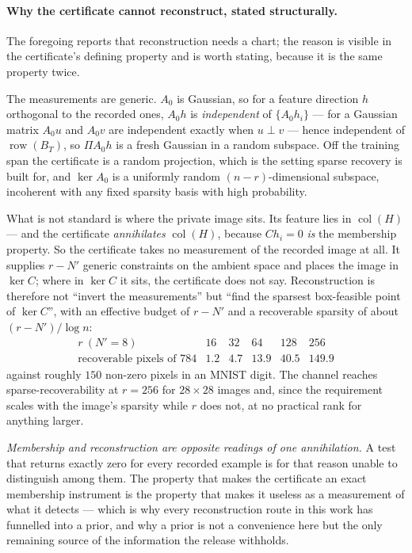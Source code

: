 \paragraph{Why the certificate cannot reconstruct, stated structurally.} The
foregoing reports that reconstruction needs a chart; the reason is visible in
the certificate's defining property and is worth stating, because it is the
same property twice.

The measurements are generic. $A_0$ is Gaussian, so for a feature direction
$h$ orthogonal to the recorded ones, $A_0h$ is \emph{independent} of
$\{A_0h_i\}$ --- for a Gaussian matrix $A_0u$ and $A_0v$ are independent
exactly when $u\perp v$ --- hence independent of $\operatorname{row}(B_T)$, so
$\Pi A_0h$ is a fresh Gaussian in a random subspace. Off the training span the
certificate is a random projection, which is the setting sparse recovery is
built for, and $\ker A_0$ is a uniformly random $(n-r)$-dimensional subspace,
incoherent with any fixed sparsity basis with high probability.

What is not standard is where the private image sits. Its feature lies in
$\operatorname{col}(H)$ --- and the certificate \emph{annihilates}
$\operatorname{col}(H)$, because $Ch_i=0$ \emph{is} the membership property.
So the certificate takes no measurement of the recorded image at all. It
supplies $r-N'$ generic constraints on the ambient space and places the image
in $\ker C$; where in $\ker C$ it sits, the certificate does not say.
Reconstruction is therefore not ``invert the measurements'' but ``find the
sparsest box-feasible point of $\ker C$'', with an effective budget of $r-N'$
and a recoverable sparsity of about $(r-N')/\log n$:
\[
\begin{array}{r|ccccc}
 r \ (N'=8) & 16 & 32 & 64 & 128 & 256\\ \hline
 \text{recoverable pixels of }784 & 1.2 & 4.7 & 13.9 & 40.5 & 149.9
\end{array}
\]
against roughly $150$ non-zero pixels in an MNIST digit. The channel reaches
sparse-recoverability at $r=256$ for $28\times28$ images and, since the
requirement scales with the image's sparsity while $r$ does not, at no
practical rank for anything larger.

\emph{Membership and reconstruction are opposite readings of one annihilation.}
A test that returns exactly zero for every recorded example is for that reason
unable to distinguish among them. The property that makes the certificate an
exact membership instrument is the property that makes it useless as a
measurement of what it detects --- which is why every reconstruction route in
this work has funnelled into a prior, and why a prior is not a convenience
here but the only remaining source of the information the release withholds.

